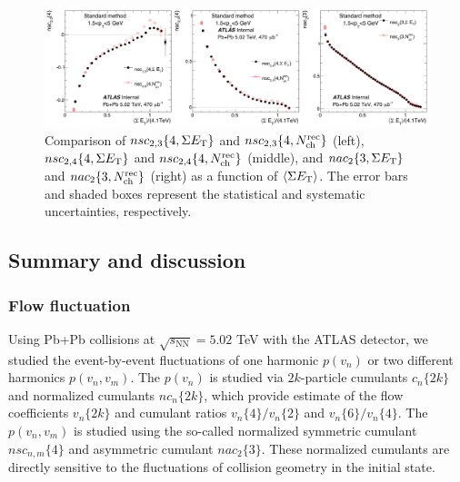 \begin{figure}[H]
\centering
\includegraphics[width=.95\linewidth]{figs/chapter_centfluc/ATLAS_others_cf2.png}
\caption{Comparison of $nsc_{2,3}\{4, \Sigma E_\text{T}\}$ and $nsc_{2,3}\{4, N_\text{ch}^\text{rec}\}$ (left), $nsc_{2,4}\{4, \Sigma E_\text{T}\}$ and $nsc_{2,4}\{4, N_\text{ch}^\text{rec}\}$ (middle), and $nac_{2}\{3, \Sigma E_\text{T}\}$ and $nac_{2}\{3, N_\text{ch}^\text{rec}\}$ (right) as a function of $\left\langle \Sigma E_\text{T}\right\rangle$. The error bars and shaded boxes represent the statistical and systematic uncertainties, respectively.}
\label{fig:centfluc_ATLAS_others_cf2}
\end{figure}



\subsection{Summary and discussion}

\subsubsection{Flow fluctuation}

Using Pb+Pb collisions at $\sqrt{s_\text{NN}} = 5.02$ TeV with the ATLAS detector, we studied the event-by-event fluctuations of one harmonic $p(v_n)$ or two different harmonics $p(v_n, v_m)$. The $p(v_n)$ is studied via $2k$-particle cumulants $c_n\{2k\}$ and normalized cumulants $nc_n\{2k\}$, which provide estimate of the flow coefficients $v_n\{2k\}$ and cumulant ratios $v_n\{4\} / v_n\{2\}$ and $v_n\{6\} / v_n\{4\}$. The $p(v_n, v_m)$ is studied using the so-called normalized symmetric cumulant $nsc_{n,m}\{4\}$ and asymmetric cumulant $nac_2\{3\}$. These normalized cumulants are directly sensitive to the fluctuations of collision geometry in the initial state.

